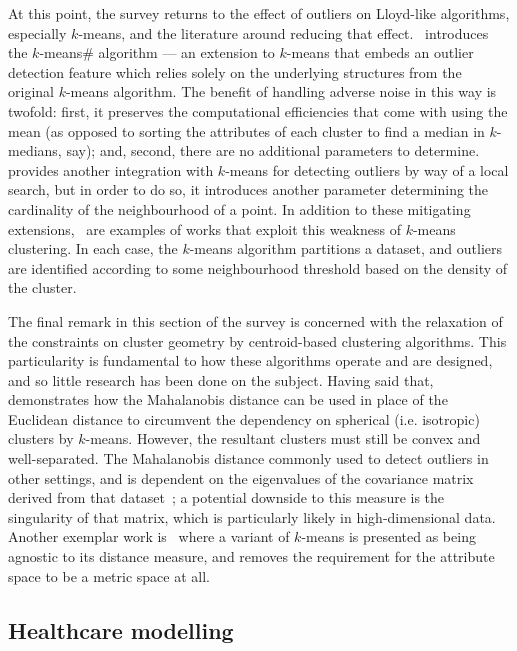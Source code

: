 At this point, the survey returns to the effect of outliers on Lloyd-like
algorithms, especially \(k\)-means, and the literature around reducing that
effect.~\cite{Olukanmi2017} introduces the \(k\)-means\# algorithm --- an
extension to \(k\)-means that embeds an outlier detection feature which relies
solely on the underlying structures from the original \(k\)-means algorithm.
The benefit of handling adverse noise in this way is twofold: first, it
preserves the computational efficiencies that come with using the mean (as
opposed to sorting the attributes of each cluster to find a median in
\(k\)-medians, say); and, second, there are no additional parameters to
determine.~\cite{Gupta2017} provides another integration with \(k\)-means for
detecting outliers by way of a local search, but in order to do so, it
introduces another parameter determining the cardinality of the neighbourhood of
a point. In addition to these mitigating extensions,~\cite{Lei2012,Wei2019} are
examples of works that exploit this weakness of \(k\)-means clustering. In each
case, the \(k\)-means algorithm partitions a dataset, and outliers are
identified according to some neighbourhood threshold based on the density of the
cluster.

The final remark in this section of the survey is concerned with the relaxation
of the constraints on cluster geometry by centroid-based clustering algorithms.
This particularity is fundamental to how these algorithms operate and are
designed, and so little research has been done on the subject. Having said
that,~\cite{Sung1998} demonstrates how the Mahalanobis distance can be used in
place of the Euclidean distance to circumvent the dependency on spherical (i.e.
isotropic) clusters by \(k\)-means. However, the resultant clusters must still
be convex and well-separated. The Mahalanobis distance commonly used to detect
outliers in other settings, and is dependent on the eigenvalues of the
covariance matrix derived from that dataset~\cite{Mahalanobis1936}; a potential
downside to this measure is the singularity of that matrix, which is
particularly likely in high-dimensional data. Another exemplar work
is~\cite{Statman2020} where a variant of \(k\)-means is presented as being
agnostic to its distance measure, and removes the requirement for the attribute
space to be a metric space at all.

\subsection{Healthcare modelling}

